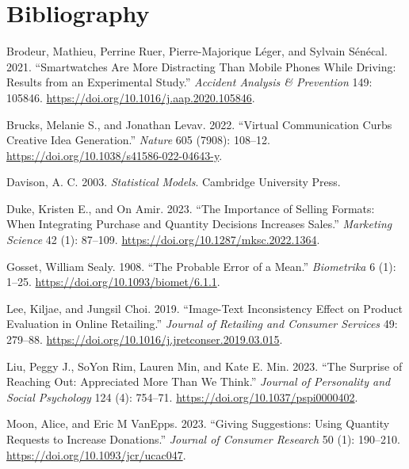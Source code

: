 \documentclass[
  11pt,
  letterpaper,
]{scrbook}
\newlength{\cslhangindent}
\newenvironment{CSLReferences}[2] %
 {\begin{list}{}{%
  \setlength{\itemindent}{0pt}
  \setlength{\leftmargin}{0pt}
  \setlength{\parsep}{0pt}
  \ifodd #1
   \setlength{\leftmargin}{\cslhangindent}
   \setlength{\itemindent}{-1\cslhangindent}
  \fi
  \setlength{\itemsep}{#2\baselineskip}}}
 {\end{list}}
\theoremstyle{definition}
\theoremstyle{definition}
\theoremstyle{plain}
\theoremstyle{remark}
\begin{document}

\chapter*{Bibliography}\label{bibliography}


\label{refs}
\begin{CSLReferences}{1}{0}
Brodeur, Mathieu, Perrine Ruer, Pierre-Majorique Léger, and Sylvain
Sénécal. 2021. {``Smartwatches Are More Distracting Than Mobile Phones
While Driving: Results from an Experimental Study.''} \emph{Accident
Analysis \& Prevention} 149: 105846.
\url{https://doi.org/10.1016/j.aap.2020.105846}.

Brucks, Melanie S., and Jonathan Levav. 2022. {``Virtual Communication
Curbs Creative Idea Generation.''} \emph{Nature} 605 (7908): 108--12.
\url{https://doi.org/10.1038/s41586-022-04643-y}.

Davison, A. C. 2003. \emph{Statistical Models}. Cambridge University
Press.

Duke, Kristen E., and On Amir. 2023. {``The Importance of Selling
Formats: When Integrating Purchase and Quantity Decisions Increases
Sales.''} \emph{Marketing Science} 42 (1): 87--109.
\url{https://doi.org/10.1287/mksc.2022.1364}.

Gosset, William Sealy. 1908. {``The Probable Error of a Mean.''}
\emph{Biometrika} 6 (1): 1--25.
\url{https://doi.org/10.1093/biomet/6.1.1}.

Lee, Kiljae, and Jungsil Choi. 2019. {``Image-Text Inconsistency Effect
on Product Evaluation in Online Retailing.''} \emph{Journal of Retailing
and Consumer Services} 49: 279--88.
\url{https://doi.org/10.1016/j.jretconser.2019.03.015}.

Liu, Peggy J., SoYon Rim, Lauren Min, and Kate E. Min. 2023. {``The
Surprise of Reaching Out: Appreciated More Than We Think.''}
\emph{Journal of Personality and Social Psychology} 124 (4): 754--71.
\url{https://doi.org/10.1037/pspi0000402}.

Moon, Alice, and Eric M VanEpps. 2023. {``Giving Suggestions: Using
Quantity Requests to Increase Donations.''} \emph{Journal of Consumer
Research} 50 (1): 190--210. \url{https://doi.org/10.1093/jcr/ucac047}.


\end{CSLReferences}
\end{document}
